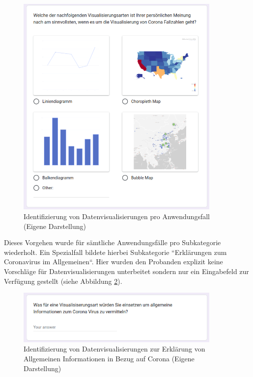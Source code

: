 \begin{figure}[h]
    \includegraphics[width=10cm]{images/online_formular_use_cases_and_visualizations.png}
    \centering
    \caption{Identifizierung von Datenvisualisierungen pro Anwendungsfall (Eigene Darstellung)}
    \label{fig:online_formular_use_cases_and_visualizations}
\end{figure}

Dieses Vorgehen wurde für sämtliche Anwendungsfälle pro Subkategorie wiederholt. Ein Spezialfall bildete hierbei Subkategorie ``Erklärungen zum Coronavirus im Allgemeinen``. Hier wurden den Probanden explizit keine Vorschläge für Datenvisualisierungen unterbeitet sondern nur ein Eingabefeld zur Verfügung gestellt (siehe Abbildung \ref{fig:online_formular_special_case_for_general_information}).

\begin{figure}[h]
    \includegraphics[width=10cm]{images/online_formular_special_case_for_general_information.png}
    \centering
    \caption{Identifizierung von Datenvisualisierungen zur Erklärung von Allgemeinen Informationen in Bezug auf Corona (Eigene Darstellung)}
    \label{fig:online_formular_special_case_for_general_information}
\end{figure}

